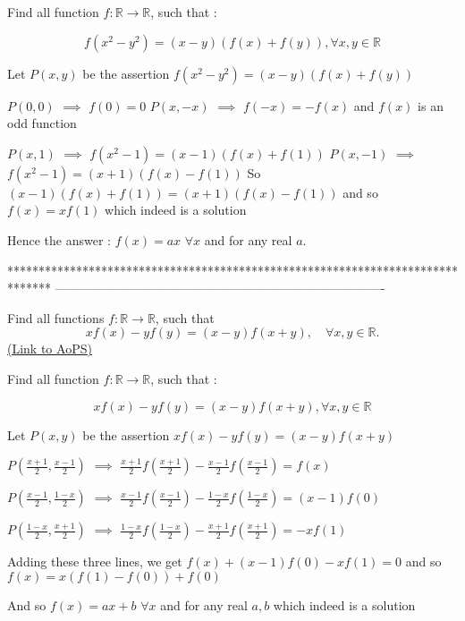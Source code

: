 \begin{solution}
	\begin{tcolorbox}Find all function $f : \mathbb{R} \rightarrow \mathbb{R}$, such that :

\[ f(x^2 - y^2) = (x - y)(f(x) + f(y)), \forall x, y \in \mathbb{R} \]\end{tcolorbox}
Let $P(x,y)$ be the assertion $f(x^2-y^2)=(x-y)(f(x)+f(y))$

$P(0,0)$ $\implies$ $f(0)=0$
$P(x,-x)$ $\implies$ $f(-x)=-f(x)$ and $f(x)$ is an odd function

$P(x,1)$ $\implies$ $f(x^2-1)=(x-1)(f(x)+f(1))$ 
$P(x,-1)$ $\implies$ $f(x^2-1)=(x+1)(f(x)-f(1))$ 
So $(x-1)(f(x)+f(1))=(x+1)(f(x)-f(1))$ and so $f(x)=xf(1)$ which indeed is a solution

Hence the answer : $\boxed{f(x)=ax}$ $\forall x$ and for any real $a$.
\end{solution}
*******************************************************************************
-------------------------------------------------------------------------------

\begin{problem}
	Find all functions $f : \mathbb{R} \to\mathbb{R}$, such that
\[ xf(x) - yf(y) = (x-y)f(x+y), \quad \forall x, y \in \mathbb{R}. \]
	\flushright \href{https://artofproblemsolving.com/community/c6h442810}{(Link to AoPS)}
\end{problem}



\begin{solution}
	\begin{tcolorbox}Find all function $f : \mathbb{R} \rightarrow \mathbb{R}$, such that :

\[ xf(x) - yf(y) = (x-y)f(x+y), \forall x, y \in \mathbb{R} \]\end{tcolorbox}
Let $P(x,y)$ be the assertion $xf(x)-yf(y)=(x-y)f(x+y)$


$P(\frac{x+1}2,\frac{x-1}2)$ $\implies$ $\frac{x+1}2f(\frac{x+1}2)-\frac{x-1}2f(\frac{x-1}2)=f(x)$

$P(\frac{x-1}2,\frac{1-x}2)$ $\implies$ $\frac{x-1}2f(\frac{x-1}2)-\frac{1-x}2f(\frac{1-x}2)=(x-1)f(0)$

$P(\frac{1-x}2,\frac{x+1}2)$ $\implies$ $\frac{1-x}2f(\frac{1-x}2)-\frac{x+1}2f(\frac{x+1}2)=-xf(1)$

Adding these three lines, we get $f(x)+(x-1)f(0)-xf(1)=0$ and so $f(x)=x(f(1)-f(0))+f(0)$

And so $\boxed{f(x)=ax+b}$ $\forall x$ and for any real $a,b$ which indeed is a solution
\end{solution}



